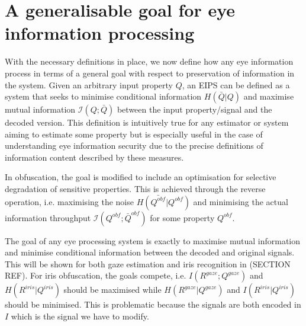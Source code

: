 

\section{A generalisable goal for eye information processing}
With the necessary definitions in place, we now define how any eye information process in terms of a general goal with respect to preservation of information in the system. Given an arbitrary input property $Q$, an EIPS can be defined as a system that seeks to minimise conditional information $H(\bar{Q}|Q)$ and maximise mutual information $\mathcal{I}(Q;\bar{Q})$ between the input property/signal and the decoded version. This definition is intuitively true for any estimator or system aiming to estimate some property but is especially useful in the case of understanding eye information security due to the precise definitions of information content described by these measures.

In obfuscation, the goal is modified to include an optimisation for selective degradation of sensitive properties. This is achieved through the reverse operation, i.e. maximising the noise $H(\bar{Q^{obf}}|Q^{obf})$ and minimising the actual information throughput $\mathcal{I}(Q^{obf};\bar{Q}^{obf})$ for some property $Q^{obf}$. 

The goal of any eye processing system is exactly to maximise mutual information and minimise conditional information between the decoded and original signals. This will be shown for both gaze estimation and iris recognition in (SECTION REF). For iris obfuscation, the goals compete, i.e. $I(R^{gaze};Q^{gaze})$ and $H(R^{iris}|Q^{iris})$ should be maximised while $H(R^{gaze}|Q^{gaze})$ and $I(R^{iris}|Q^{iris})$ should be minimised. This is problematic because the signals are both encoded in $I$ which is the signal we have to modify. 

